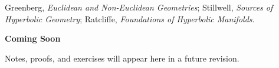 \begin{remark*}
Greenberg, \textit{Euclidean and Non-Euclidean Geometries};
Stillwell, \textit{Sources of Hyperbolic Geometry};
Ratcliffe, \textit{Foundations of Hyperbolic Manifolds}.
\end{remark*}

\vspace{1em}
\begin{tcolorbox}[
  colback=gray!6, colframe=gray!40, arc=2pt,
  left=8pt, right=8pt, top=6pt, bottom=6pt,
  title={\small\textbf{Status: Planned}},
  fonttitle=\small\bfseries
]
\begin{center}\Large\bfseries Coming Soon\end{center}
\vspace{6pt}
\noindent Notes, proofs, and exercises will appear here in a future revision.
\end{tcolorbox}

% 
% 
% 
% 
% 
% 
% 
